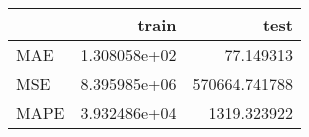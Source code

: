 \begin{tabular}{lrr}
\toprule
{} &         train &           test \\
\midrule
MAE  &  1.308058e+02 &      77.149313 \\
MSE  &  8.395985e+06 &  570664.741788 \\
MAPE &  3.932486e+04 &    1319.323922 \\
\bottomrule
\end{tabular}
